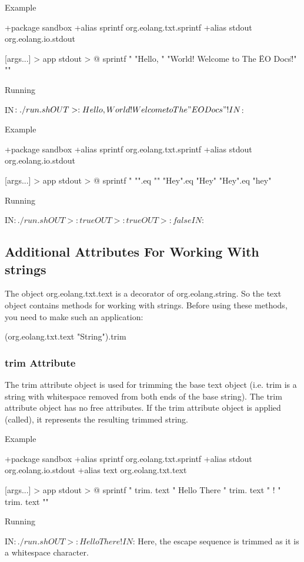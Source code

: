 \documentclass[12pt]{book}
\begin{document}
Example
\begin{ffcode}
+package sandbox
+alias sprintf org.eolang.txt.sprintf
+alias stdout org.eolang.io.stdout

[args...] > app
  stdout > @
    sprintf
      "%
      "Hello, "
      "World! Welcome to The \"EO Docs\"!"
      "\n"

Running

IN$: ./run.sh
OUT>: Hello, World! Welcome to The "EO Docs"!
IN$: 
\end{ffcode}

Example
\begin{ffcode}
+package sandbox
+alias sprintf org.eolang.txt.sprintf
+alias stdout org.eolang.io.stdout

[args...] > app
  stdout > @
    sprintf
      "%
      "".eq ""
      "Hey".eq "Hey"
      "Hey".eq "hey"

Running

IN$: ./run.sh
OUT>: true
OUT>: true
OUT>: false
IN$: 
\end{ffcode}

\subsection{Additional Attributes For Working With strings}
The object org.eolang.txt.text is a decorator of org.eolang.string. So the text object contains methods for working with strings. Before using these methods, you need to make such an application:
\begin{ffcode}
(org.eolang.txt.text "String").trim
\end{ffcode}

\subsubsection{trim Attribute} 
The trim attribute object is used for trimming the base text object (i.e. trim is a string with whitespace removed from both ends of the base string).
The trim attribute object has no free attributes.
If the trim attribute object is applied (called), it represents the resulting trimmed string.

Example

\begin{ffcode}
+package sandbox
+alias sprintf org.eolang.txt.sprintf
+alias stdout org.eolang.io.stdout
+alias text org.eolang.txt.text

[args...] > app
  stdout > @
    sprintf
      "%
      trim.
        text "  Hello There  "
      trim.
        text "            !           "
      trim.
        text "\n"

Running

IN$: ./run.sh
OUT>: Hello There!IN$: 
Here, the \n escape sequence is trimmed as it is a
whitespace character.
\end{ffcode}
\end{document}
